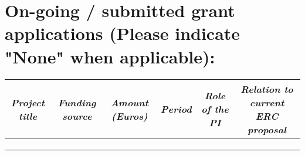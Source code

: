 \documentclass{erc-B2}
\begin{document}
\section*{On-going / submitted grant applications (Please indicate "None" when applicable):}
\vspace{-0.4cm}
\begin{table}[h]
  \begin{tabular}{c|c|c|c|c|c}
    \textit{Project title} & \textit{Funding source} & \textit{Amount (Euros)} & \textit{Period} & \textit{Role of the PI} & \textit{Relation to current ERC proposal} \\
    \toprule
    & & & & & \\
    \midrule
    & & & & & \\
    \midrule
    & & & & & \\
    \bottomrule
  \end{tabular}
\end{table}

\pagebreak
\bigskip
\printbibliography[prenote=bolditalics]
\end{document}
